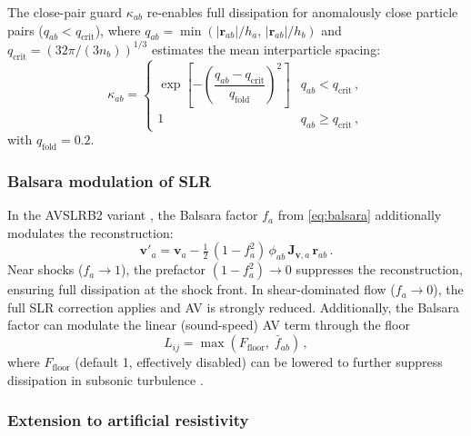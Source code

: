 The close-pair guard $\kappa_{ab}$ \cite{Frontiere2017} re-enables full dissipation for anomalously close particle pairs ($q_{ab} < q_\mathrm{crit}$), where $q_{ab} = \min(|\mathbf{r}_{ab}|/h_a,\, |\mathbf{r}_{ab}|/h_b)$ and $q_\mathrm{crit} = (32\pi/(3 n_b))^{1/3}$ estimates the mean interparticle spacing:
\begin{equation}
    \kappa_{ab} = \begin{cases}
        \exp\!\left[-\left(\dfrac{q_{ab} - q_\mathrm{crit}}{q_\mathrm{fold}}\right)^{\!2}\right] & q_{ab} < q_\mathrm{crit}\,, \\[6pt]
        1 & q_{ab} \geq q_\mathrm{crit}\,,
    \end{cases}
    \label{eq:kappa}
\end{equation}
with $q_\mathrm{fold} = 0.2$.


\subsubsection*{Balsara modulation of SLR}

In the AVSLRB2 variant \cite{Cabezon2026}, the Balsara factor $f_a$ from \eqref{eq:balsara} additionally modulates the reconstruction:
\begin{equation}
    \mathbf{v}'_a = \mathbf{v}_a - \tfrac{1}{2}\,(1 - f_a^2)\,\phi_{ab}\, \mathbf{J}_{\mathbf{v},a}\, \mathbf{r}_{ab}\,.
    \label{eq:slr_balsara}
\end{equation}
Near shocks ($f_a \to 1$), the prefactor $(1 - f_a^2) \to 0$ suppresses the reconstruction, ensuring full dissipation at the shock front. In shear-dominated flow ($f_a \to 0$), the full SLR correction applies and AV is strongly reduced. Additionally, the Balsara factor can modulate the linear (sound-speed) AV term through the floor
\begin{equation}
    L_{ij} = \max(F_\mathrm{floor},\; \bar{f}_{ab})\,,
    \label{eq:Lij}
\end{equation}
where $F_\mathrm{floor}$ (default 1, effectively disabled) can be lowered to further suppress dissipation in subsonic turbulence \cite{Cabezon2026}.


\subsubsection*{Extension to artificial resistivity}

